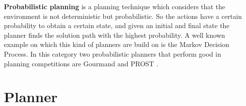 \textbf{Probabilistic planning} is a planning technique which considers that the environment is not deterministic but probabilistic. So the actions have a certain probability to obtain a certain state, and given an initial and final state the planner  finds the solution path with the highest probability. A well known example on which this kind of planners are build on is the Markov Decision Process.
In this category two probabilistic planners that perform good in planning competitions are Gourmand \cite{Gourmand} and PROST \cite{PROST}.

\section{Planner}

